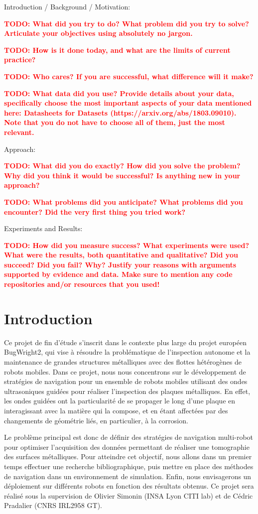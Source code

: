 \documentclass[francais,RandD]{rapportPFE}
\newcommand{\TODO}[1]{\textcolor{red}{\textbf{TODO: #1}}}
\begin{document}
	Introduction / Background / Motivation:

	\TODO{What did you try to do? What problem did you try to solve? Articulate your objectives using absolutely no jargon.}

	\TODO{How is it done today, and what are the limits of current practice?}

	\TODO{Who cares? If you are successful, what difference will it make?}

	\TODO{What data did you use? Provide details about your data, specifically choose the most important aspects of your data mentioned here: Datasheets for Datasets (https://arxiv.org/abs/1803.09010). Note that you do not have to choose all of them, just the most relevant.}

	Approach:

	\TODO{What did you do exactly? How did you solve the problem? Why did you think it would be successful? Is anything new in your approach?}

	\TODO{What problems did you anticipate? What problems did you encounter? Did the very first thing you tried work?}

	Experiments and Results:

	\TODO{How did you measure success? What experiments were used? What were the results, both quantitative and qualitative? Did you succeed? Did you fail? Why? Justify your reasons with arguments supported by evidence and data. Make sure to mention any code repositories and/or resources that you used!}

	\section{Introduction}
		Ce projet de fin d'étude s'inscrit dans le contexte plus large du projet européen BugWright2, qui vise à résoudre la problématique de l'inspection autonome et la maintenance de grandes structures métalliques avec des flottes hétérogènes de robots mobiles. Dans ce projet, nous nous concentrons sur le développement de stratégies de navigation pour un ensemble de robots mobiles utilisant des ondes ultrasoniques guidées pour réaliser l'inspection des plaques métalliques. En effet, les ondes guidées ont la particularité de se propager le long d'une plaque en interagissant avec la matière qui la compose, et en étant affectées par des changements de géométrie liés, en particulier, à la corrosion.

		Le problème principal est donc de définir des stratégies de navigation multi-robot pour optimiser l'acquisition des données permettant de réaliser une tomographie des surfaces métalliques. Pour atteindre cet objectif, nous allons dans un premier temps effectuer une recherche bibliographique, puis mettre en place des méthodes de navigation dans un environnement de simulation. Enfin, nous envisagerons un déploiement sur différents robots en fonction des résultats obtenus. Ce projet sera réalisé sous la supervision de Olivier Simonin (INSA Lyon CITI lab) et de Cédric Pradalier (CNRS IRL2958 GT).
\end{document}
